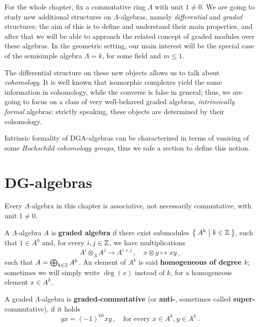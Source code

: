 
For the whole chapter, fix a commutative ring $\Lambda$ 
with unit $1 \ne 0$. We are going to study new
additional structures on $\Lambda$-algebras, 
namely \emph{differential} and \emph{graded} structures;
the aim of this is to define and understand their main properties,
and after that we will be able to
approach the related concept of graded modules over these algebras. 
In the geometric setting, our main interest will be the special case
of the semisimple algebra $\Lambda = k$,
for some field and $m \le 1$.

The differential structure on these new objects
allows us to talk about \emph{cohomology}.
It is well known that isomorphic complexes
yield the same information in cohomology,
while the converse is false in general;
thus, we are going to focus on a class of very well-behaved 
graded algebras, \emph{intrinsically formal} algebras:
strictly speaking, these objects are determined
by their cohomology. 

Intrinsic formality of DGA-algebras
can be characterized in terms of vanising
of some \emph{Hochschild cohomology groups},
thus we safe a section to define this notion.

\section{DG-algebras}

	Every $\Lambda$-algebra in this chapter is associative,
	not necessarily commutative,
	with unit $1 \ne 0$.
	
	\begin{df}
		A $\Lambda$-algebra $A$ is \textbf{graded algebra}
		if there exist submodules $\Set{A^{k} | k \in {\mathbb Z}}$,
		such that $1 \in A^{0}$ and,
		for every $i,j \in {\mathbb Z}$, we have multiplications
		\begin{equation*}
			A^{i} \otimes_{\Lambda} A^{j} \longrightarrow A^{i+j}\,,
			\quad x \otimes y \longmapsto xy\,,
		\end{equation*}
		such that $A = \bigoplus_{k \in {\mathbb Z}} A^{k}$.
		An element of $A^{k}$ is said \textbf{homogeneous of degree $k$};
		sometimes we will simply write $\deg(x)$ instead of $k$,
		for a homogeneous element $x \in A^{k}$.
		
		A graded $\Lambda$-algebra is \textbf{graded-commutative} 
		(or \textbf{anti-}, sometimes called \textbf{super-}commutative),
		if it holds
		\begin{equation*}
			yx = (-1)^{kh} xy\,,
			\quad \text{for every } x \in A^{k}, y \in A^{h}\,.
		\end{equation*}
	\end{df}
	
